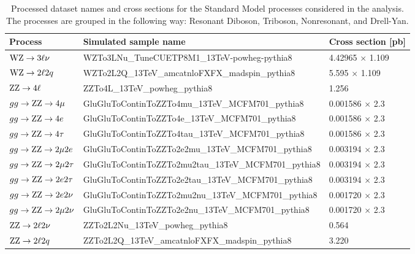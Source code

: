 \begin{table}
  \caption{Processed dataset names and cross sections for the Standard Model processes considered in the analysis.
           The processes are grouped in the following way: Resonant Diboson, Triboson, Nonresonant, and Drell-Yan.\label{tab:mcprocess}}
    \begin{center}
    {\scriptsize
      \begin{tabular}{|p{3.0cm}|p{13cm}|p{3.5cm}|}
      \hline 
       \bf{Process} & \bf{Simulated sample name} & \bf{Cross section [pb]}\\
       \hline 
       $\mathrm{W}\mathrm{Z}\to 3\ell\nu$               & WZTo3LNu\_TuneCUETP8M1\_13TeV-powheg-pythia8 & 4.42965 $\times$ 1.109 \\ 
       $\mathrm{W}\mathrm{Z}\to 2\ell 2q$               & WZTo2L2Q\_13TeV\_amcatnloFXFX\_madspin\_pythia8 & 5.595 $\times$ 1.109 \\ 
       $\mathrm{Z}\mathrm{Z}\to 4\ell$                  & ZZTo4L\_13TeV\_powheg\_pythia8 & 1.256 \\ 
       $gg \to \mathrm{Z}\mathrm{Z} \to 4\mu$           & GluGluToContinToZZTo4mu\_13TeV\_MCFM701\_pythia8     & 0.001586 $\times$ 2.3  \\
       $gg \to \mathrm{Z}\mathrm{Z} \to 4e$             & GluGluToContinToZZTo4e\_13TeV\_MCFM701\_pythia8      & 0.001586 $\times$ 2.3  \\
       $gg \to \mathrm{Z}\mathrm{Z} \to 4\tau$          & GluGluToContinToZZTo4tau\_13TeV\_MCFM701\_pythia8    & 0.001586 $\times$ 2.3  \\
       $gg \to \mathrm{Z}\mathrm{Z} \to 2\mu 2e$        & GluGluToContinToZZTo2e2mu\_13TeV\_MCFM701\_pythia8   & 0.003194 $\times$ 2.3  \\
       $gg \to \mathrm{Z}\mathrm{Z} \to 2\mu 2\tau$     & GluGluToContinToZZTo2mu2tau\_13TeV\_MCFM701\_pythia8 & 0.003194 $\times$ 2.3  \\
       $gg \to \mathrm{Z}\mathrm{Z} \to 2e 2\tau$       & GluGluToContinToZZTo2e2tau\_13TeV\_MCFM701\_pythia8  & 0.003194 $\times$ 2.3  \\
       $gg \to \mathrm{Z}\mathrm{Z} \to 2e 2\nu$        & GluGluToContinToZZTo2mu2nu\_13TeV\_MCFM701\_pythia8  & 0.001720 $\times$ 2.3  \\
       $gg \to \mathrm{Z}\mathrm{Z} \to 2\mu 2\nu$       & GluGluToContinToZZTo2e2nu\_13TeV\_MCFM701\_pythia8   & 0.001720 $\times$ 2.3  \\
       $\mathrm{Z}\mathrm{Z}\to 2\ell 2\nu$             & ZZTo2L2Nu\_13TeV\_powheg\_pythia8 & 0.564 \\ 
       $\mathrm{Z}\mathrm{Z}\to 2\ell 2q$               & ZZTo2L2Q\_13TeV\_amcatnloFXFX\_madspin\_pythia8 & 3.220 \\ 

\end{tabular}}
\end{center}
\end{table}
